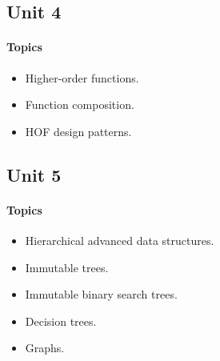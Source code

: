 \subsection*{Unit 4}
\paragraph*{Topics}			
\begin{itemize}[noitemsep]
  \item Higher-order functions.
  \item Function composition.
  \item HOF design patterns.
\end{itemize}

\subsection*{Unit 5}
\paragraph*{Topics}
\begin{itemize}[noitemsep]
  \item Hierarchical advanced data structures.
  \item Immutable trees.
  \item Immutable binary search trees.
  \item Decision trees.
  \item Graphs.
\end{itemize}
